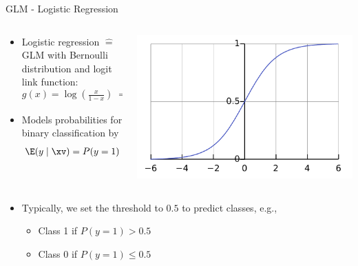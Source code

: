 \documentclass[11pt,compress,t,notes=noshow, aspectratio=169, xcolor=table]{beamer}
\begin{document}
\begin{frame}{GLM - Logistic Regression}
\begin{columns}[T, totalwidth=\textwidth]
\begin{column}{0.6\textwidth}

\begin{itemize}
    \item<1-> Logistic regression $\hat{=}$ GLM with Bernoulli distribution and logit link function: 
    $$g(x) = \log\left(\tfrac{x}{1 - x}\right) \; \Rightarrow \; g^{-1}(x) = \tfrac{1}{1+\exp(-x)} $$
    \item<1-> Models probabilities for binary classification by
    $$\E(y \mid \xv) = P(y = 1) = g^{-1}(\xv^\top \beta) = \tfrac{1}{1 + \exp(-( \xv^\top \beta ))} $$
        \end{itemize}
\end{column}
\begin{column}{0.4\textwidth}

\includegraphics[width = \textwidth]{figure/Logistic-curve.pdf}

\end{column}
\end{columns}

\begin{itemize}
    \item<2-> Typically, we set the threshold to $0.5$ to predict classes, e.g.,
        \begin{itemize}
            \item Class 1 if $P(y=1) > 0.5$
            \item Class 0 if $P(y=1) \leq 0.5$
        \end{itemize}
\end{itemize}
\end{frame}
\end{document}

